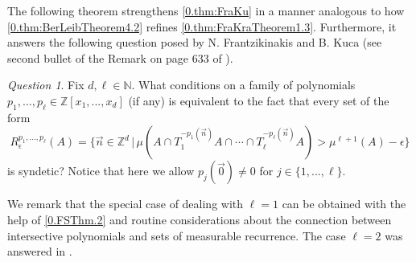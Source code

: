 \documentclass[11pt,american,preprint]{elsarticle}
\numberwithin{equation}{section}
\theoremstyle{plain}
\theoremstyle{plain*}
\theoremstyle{plain}
\theoremstyle{plain*}
\theoremstyle{plain}
\theoremstyle{plain*}
\theoremstyle{remark}
\newtheorem{question}[thm]{Question}
\theoremstyle{remark*}
\theoremstyle{remark}
\theoremstyle{remark*}
\theoremstyle{remark}
\theoremstyle{remark*}
\theoremstyle{plain}
\theoremstyle{definition}
\theoremstyle{plain}
\theoremstyle{plain} %
\newcommand{\N}{\mathbb{N}}
\newcommand{\Z}{\mathbb{Z}}
\begin{document}
The following theorem strengthens \cref{0.thm:FraKu} in a manner analogous to how \cref{0.thm:BerLeibTheorem4.2} refines \cref{0.thm:FraKraTheorem1.3}. Furthermore, it answers the following question posed by N. Frantzikinakis and B. Kuca (see second bullet of the Remark on page 633 of \cite{FraKuJoinErgForIndependentPolys}). 
\begin{question}\label{0.Q:FraKu}
    Fix $d,\ell\in\N$. What conditions on a family of polynomials $p_1,...,p_\ell\in \Z[x_1,...,x_d]$ (if any) is equivalent to the fact that every set of the form 
    \begin{equation}
    R_\epsilon^{p_1,...,p_\ell}(A)=\{\vec n\in \Z^d\,|\,\mu(A\cap T_1^{-p_1(\vec n)}A\cap\cdots\cap T_\ell^{-p_\ell(\vec n)}A)>\mu^{\ell+1}(A)-\epsilon\}
    \end{equation}
    is syndetic? Notice that here we allow $p_j(\vec 0)\neq 0$ for $j\in\{1,...,\ell\}$.  
\end{question}
We remark that the special case
of  dealing with $\ell=1$ can be obtained with the help of \cref{0.FSThm.2} and routine considerations about the connection between intersective polynomials and sets of measurable recurrence. The case $\ell=2$ was answered in \cite{FraKuJoinErgForIndependentPolys}. 
\end{document}
